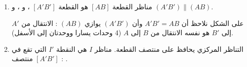 \documentclass[12pt,a4paper]{article}
\begin{document}
\begin{corr}[title={مناظرات على الشبكة}, stars=1, source={Axiomaths}]
\begin{enumerate}[itemsep=14pt]
\begin{center}
  \end{center}
  \item \begin{prop}
  مناظر القطعة $[AB]$ هو القطعة $[A'B']$ ، و  ، و $(A'B')\parallel(AB)$.
  \end{prop}
  على الشكل نلاحظ أن $A'B'=AB$ وأن $(A'B')$ يوازي $(AB)$ : الانتقال من $A'$ إلى $B'$ هو نفسه الانتقال من $B$ إلى $A$ (4 وحدات يسارا ووحدتان إلى الأسفل).
  \item التناظر المركزي يحافظ على منتصف القطعة. مناظر $I$ هي النقطة $I'$ التي تقع في منتصف $[A'B']$ : .
\end{enumerate}
\end{corr}
\end{document}
